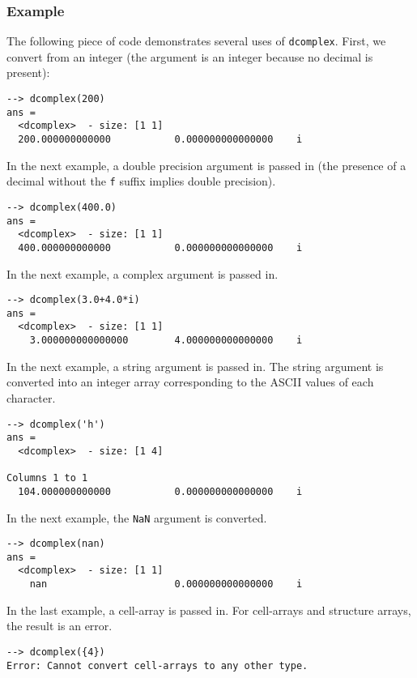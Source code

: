 \subsubsection{Example}
The following piece of code demonstrates several uses of \verb|dcomplex|.  First, we convert from an integer (the argument is an integer because no decimal is present):
\begin{verbatim}
--> dcomplex(200)
ans =
  <dcomplex>  - size: [1 1]
  200.000000000000           0.000000000000000    i
\end{verbatim}
In the next example, a double precision argument is passed in (the presence of a decimal without the \verb|f| suffix implies double precision).
\begin{verbatim}
--> dcomplex(400.0)
ans =
  <dcomplex>  - size: [1 1]
  400.000000000000           0.000000000000000    i
\end{verbatim}
In the next example, a complex argument is passed in. 
\begin{verbatim}
--> dcomplex(3.0+4.0*i)
ans =
  <dcomplex>  - size: [1 1]
    3.000000000000000        4.000000000000000    i
\end{verbatim}
In the next example, a string argument is passed in.  The string argument is converted into an integer array corresponding to the ASCII values of each character.
\begin{verbatim}
--> dcomplex('h')
ans =
  <dcomplex>  - size: [1 4]
  
Columns 1 to 1
  104.000000000000           0.000000000000000    i 
\end{verbatim}
In the next example, the \verb|NaN| argument is converted.
\begin{verbatim}
--> dcomplex(nan)
ans =
  <dcomplex>  - size: [1 1]
    nan                      0.000000000000000    i
\end{verbatim}
In the last example, a cell-array is passed in.  For cell-arrays and structure arrays, the result is an error.
\begin{verbatim}
--> dcomplex({4})
Error: Cannot convert cell-arrays to any other type.
\end{verbatim}
